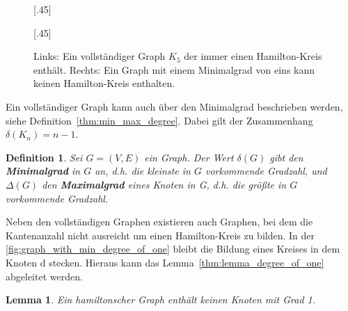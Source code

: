 \documentclass{article}
\newtheorem{mydef}{Definition}
\newtheorem{mylem}{Lemma}
\begin{document}
\begin{figure}[h]
	\centering
	\subcaptionbox{\label{fig:pentagon_graph}}[.45\linewidth]
	{
	}
	\hfill
	\subcaptionbox{\label{fig:graph_with_min_degree_of_one}}[.45\linewidth]
	{
	}
	\caption{Links: Ein vollständiger Graph $K_5$ der immer einen Hamilton-Kreis enthält. Rechts: Ein Graph mit einem Minimalgrad von eins kann keinen Hamilton-Kreis enthalten.}
\end{figure}

Ein vollständiger Graph kann auch über den Minimalgrad beschrieben werden, siehe Definition~\autoref{thm:min_max_degree}. Dabei gilt der Zusammenhang $\delta(K_n) = n-1$.

\begin{mydef}\label{thm:min_max_degree}
	Sei $G=(V,E)$ ein Graph. Der Wert $\delta(G)$ gibt den \textbf{Minimalgrad} in $G$ an, d.h. die kleinste in $G$ vorkommende Gradzahl, und $\Delta(G)$ den \textbf{Maximalgrad} eines Knoten in G, d.h. die größte in $G$ vorkommende Gradzahl. \cite{busing2010graphen}
\end{mydef}

Neben den vollständigen Graphen existieren auch Graphen, bei dem die Kantenanzahl nicht ausreicht um einen Hamilton-Kreis zu bilden. In der \autoref{fig:graph_with_min_degree_of_one} bleibt die Bildung eines Kreises in dem Knoten d stecken. Hieraus kann das Lemma~\autoref{thm:lemma_degree_of_one} abgeleitet werden.

\begin{mylem}\label{thm:lemma_degree_of_one}
	Ein hamiltonscher Graph enthält keinen Knoten mit Grad 1. \cite{busing2010graphen}
\end{mylem}

\end{document}
